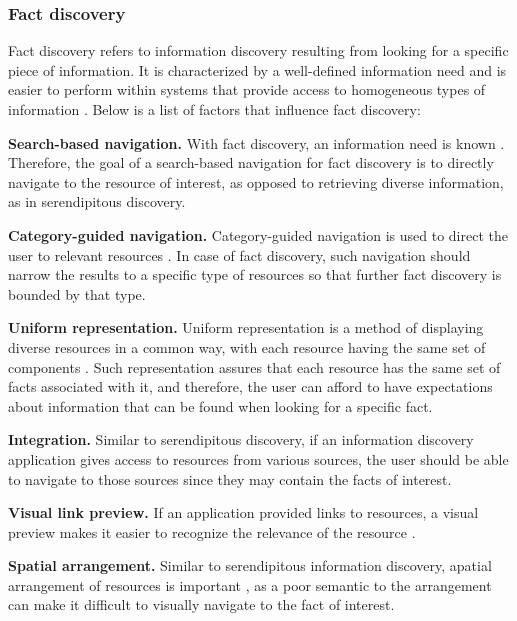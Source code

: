 \documentclass{casconpaper}
\begin{document}
{\subsubsection{Fact discovery}
Fact discovery refers to information discovery resulting from looking for a specific piece of information. It is characterized by a well-defined information need and is easier to perform within systems that provide access to homogeneous types of information \cite{kellar2006, lindley}. Below is a list of factors that influence fact discovery: 

\textbf{Search-based navigation.} With fact discovery, an information need is known \cite{kellar2006, kellar 2007}. Therefore, the goal of a search-based navigation for fact discovery is to directly navigate to the resource of interest, as opposed to retrieving diverse information, as in serendipitous discovery.

\textbf{Category-guided navigation.} Category-guided navigation is used to direct the user to relevant resources \cite{levene}. In case of fact discovery, such navigation should narrow the results to a specific type of resources so that further fact discovery is bounded by that type. 

\textbf{Uniform representation.} Uniform representation is a method of displaying diverse resources in a common way, with each resource having the same set of components \cite{herrera}. Such representation assures that each resource has the same set of facts associated with it, and therefore, the user can afford to have expectations about information that can be found when looking for a specific fact.

\textbf{Integration.} Similar to serendipitous discovery, if an information discovery application gives access to resources from various sources, the user should be able to navigate to those sources since they may contain the facts of interest.

\textbf{Visual link preview.} If an application provided links to resources, a visual preview makes it easier to recognize the relevance of the resource \cite{abrams}. 

\textbf{Spatial arrangement.} Similar to serendipitous information discovery, apatial arrangement of resources is important \cite{abrams}, as a poor semantic to the arrangement can make it difficult to visually navigate to the fact of interest.


} %
\end{document}

